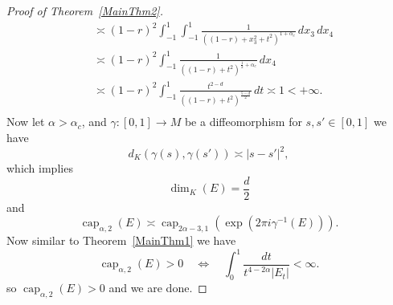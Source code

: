 \documentclass[10pt,a4paper]{amsart}
\begin{document}
\begin{proof} [Proof of Theorem~\ref{MainThm2}]
\begin{equation}
\begin{aligned}
        &\asymp (1 - r)^2 \int_{-1}^1 \int_{-1}^1  
        \frac{1}{((1-r) + x_3^2 + t^2)^{1 + \alpha_c}} \, dx_3\, dx_4 \\
        &\asymp (1 - r)^2 \int_{-1}^1  
        \frac{1}{((1-r) + t^2)^{\frac{1}{2} + \alpha_c}} \, dx_4 \\
        &\asymp (1 - r)^2 \int_{-1}^1  
        \frac{t^{2-d}}{((1-r) + t^2)^{\frac{5-d}{2}}} \, dt \asymp 1 < +\infty. \\
        \end{aligned}
    \end{equation}
    Now let $\alpha > \alpha_c$, and $\gamma : [0,1] \rightarrow M$ be a diffeomorphism for $s,s' \in [0,1]$ we have
    \begin{equation*}
        d_K(\gamma(s),\gamma(s')) \asymp |s-s'|^2,
    \end{equation*}
    which implies
    \begin{equation*}
       \dim_{K}(E) = \frac{d}{2}
    \end{equation*}
    and
    \begin{equation*}
            \operatorname{cap}_{\alpha,2}(E) \asymp \operatorname{cap}_{2\alpha-3,1}(\exp{\left(2\pi i \gamma^{-1}(E)\right)}).
    \end{equation*}
    Now similar to Theorem~{\ref{MainThm1}} we have
    \begin{equation*}
        \operatorname{cap}_{\alpha,2}({E}) > 0 
        \quad \Longleftrightarrow \quad
        \int_{0}^{1} \frac{dt}{t^{4 -2\alpha} |E_{t}|} < \infty .
    \end{equation*}
    so $\operatorname{cap}_{\alpha,2}(E)> 0$ and we are done.
\end{proof}
\end{document}
